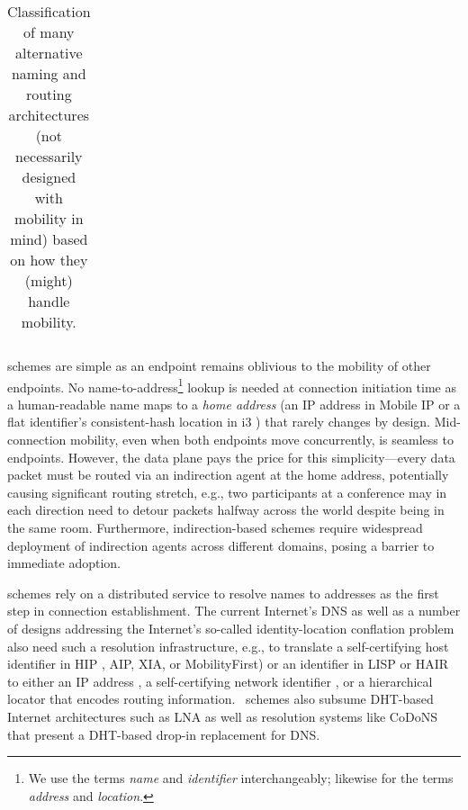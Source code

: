 {\begin{table*}[t]
{\begin{tabular}{|p{0.98in}|p{1.4in}|p{2.2in}|p{1.7in}|}
 \hline
\end{tabular}
}
\vspace{-0.15in}
\caption{Classification of many alternative naming and routing architectures (not necessarily designed with mobility in mind) based on how they (might) handle mobility.}
\vspace{-0.1in}
\label{tab:arch}
\end{table*}

}


{\textbf \Indirection} schemes are simple as an endpoint remains oblivious to the mobility of other endpoints. No name-to-address\footnote{We use the terms {\em name} and {\em identifier} interchangeably; likewise for the terms {\em address} and {\em location}.} lookup is needed at connection initiation time as a human-readable name maps to a {\em home address} (an IP address in Mobile IP \cite{MIP} or a flat identifier's consistent-hash location in i3 \cite{i3}) that rarely changes by design. Mid-connection mobility, even when both endpoints move concurrently, is seamless to endpoints. However, the data plane pays the price for this simplicity---every data packet must be routed via an indirection agent at the home address, potentially causing significant routing stretch, e.g., two participants at a conference may in each direction need to detour packets halfway across the world despite being in the same  room. %
Furthermore, indirection-based schemes require widespread deployment of indirection agents across different domains, posing a barrier to immediate adoption.

{\textbf \Logcen} schemes rely on a distributed service %
to resolve names to addresses as the first step in connection establishment. The current Internet's DNS as well as a number of designs addressing the Internet's so-called identity-location conflation problem also need such a resolution infrastructure, e.g., to translate a self-certifying host identifier in HIP \cite{HIP}, AIP\cite{AIP}, XIA\cite{XIA}, or MobilityFirst\cite{MobilityFirst-UMASS}) or an identifier in LISP \cite{LISP} or HAIR \cite{HAIR} to either an IP address \cite{HIP}, a self-certifying network identifier \cite{AIP,XIA,MobilityFirst-UMASS}, or a hierarchical locator \cite{HAIR} that encodes routing information. \Logcen\ schemes also subsume DHT-based Internet architectures such as LNA \cite{LNA,DOA} %
as well as resolution systems like CoDoNS \cite{codons-paper} that present a DHT-based drop-in replacement for DNS.

